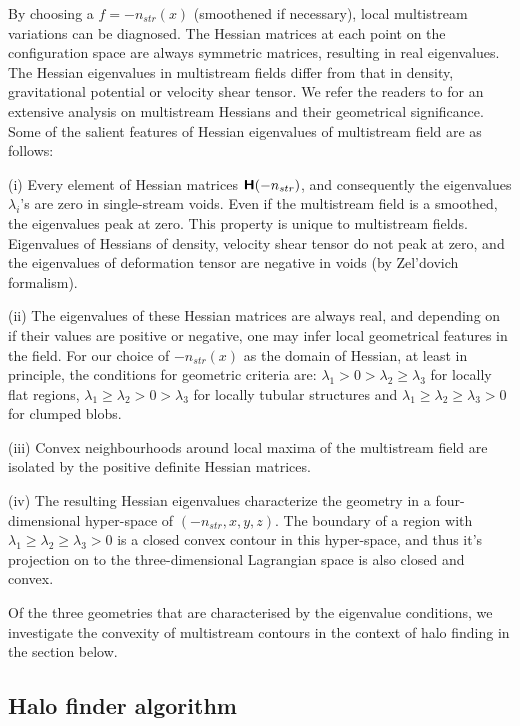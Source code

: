 \documentclass[fleqn,usenatbib,useAMS]{mnras}
\begin{document}
By choosing a $f = -n_{str}(x)$ (smoothened if necessary), local multistream variations can be diagnosed. The Hessian matrices at each point on the configuration space are always symmetric matrices, resulting in real eigenvalues. The Hessian eigenvalues in multistream fields differ from that in density, gravitational potential or velocity shear tensor. We refer the readers to \cite{Ramachandra2017} for an extensive analysis on multistream Hessians and their geometrical significance. Some of the salient features of Hessian eigenvalues of multistream field are as follows: 

(i) Every element of Hessian matrices $\textbf{\textsf{H}}(-n_{str})$, and consequently the eigenvalues $\lambda_i$'s are zero in single-stream voids. Even if the multistream field is a smoothed, the eigenvalues peak at zero. This property is unique to multistream fields. Eigenvalues of Hessians of density, velocity shear tensor \cite{Libeskind2013} do not peak at zero, and the eigenvalues of deformation tensor are negative in voids (by Zel’dovich formalism). 

(ii) The eigenvalues of these Hessian matrices are always real, and depending on if their values are positive or negative, one may infer local geometrical features in the field. For our choice of $-n_{str}(x)$ as the domain of Hessian, at least in principle, the conditions for geometric criteria are: $\lambda_1 > 0 > \lambda_2 \geq \lambda_3$ for locally flat regions, $\lambda_1 \geq \lambda_2 > 0 > \lambda_3$ for locally tubular structures and $\lambda_1 \geq \lambda_2 \geq \lambda_3 > 0$ for clumped blobs. 

(iii) Convex neighbourhoods around local maxima of the multistream field are isolated by the positive definite Hessian matrices. 

(iv) The resulting Hessian eigenvalues characterize the geometry in a four-dimensional
hyper-space of $(-n_{str}, x, y, z)$. The boundary of a region with $\lambda_1 \geq \lambda_2 \geq \lambda_3 > 0$ is a closed convex contour in this hyper-space, and thus it’s projection on to the three-dimensional Lagrangian space is also closed and convex.

Of the three geometries that are characterised by the eigenvalue conditions, we investigate the convexity of multistream contours in the context of halo finding in the section below.


\subsection{Halo finder algorithm}
\label{subsec:technique}
\end{document}
